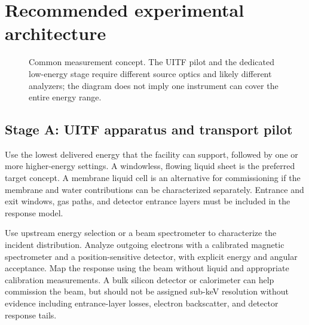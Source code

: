 \documentclass[11pt,letterpaper]{article}
\begin{document}
\section{Recommended experimental architecture}

\begin{figure}[htbp]
\centering
{}
\caption{Common measurement concept. The UITF pilot and the dedicated low-energy stage require
different source optics and likely different analyzers; the diagram does not imply one instrument
can cover the entire energy range.}
\end{figure}

\subsection{Stage A: UITF apparatus and transport pilot}

Use the lowest delivered energy that the facility can support, followed by one or more higher-energy
settings. A windowless, flowing liquid sheet is the preferred target concept. A membrane liquid cell
is an alternative for commissioning if the membrane and water contributions can be characterized
separately. Entrance and exit windows, gas paths, and detector entrance layers must be included in
the response model.

Use upstream energy selection or a beam spectrometer to characterize the incident distribution.
Analyze outgoing electrons with a calibrated magnetic spectrometer and a position-sensitive
detector, with explicit energy and angular acceptance. Map the response using the beam without
liquid and appropriate calibration measurements. A bulk silicon detector or calorimeter can help
commission the beam, but should not be assigned sub-keV resolution without evidence including
entrance-layer losses, electron backscatter, and detector response tails.
\end{document}
